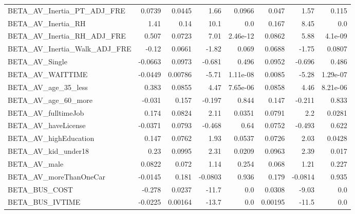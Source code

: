 \begin{tabular}{lrrrrrrr}
BETA\_AV\_Inertia\_PT\_ADJ\_FRE       &   0.0739 &   0.0445 &    1.66 &   0.0966 &         0.047 &         1.57 &         0.115 \\
BETA\_AV\_Inertia\_RH               &     1.41 &     0.14 &    10.1 &      0.0 &         0.167 &         8.45 &           0.0 \\
BETA\_AV\_Inertia\_RH\_ADJ\_FRE       &    0.507 &   0.0723 &    7.01 & 2.46e-12 &        0.0862 &         5.88 &       4.1e-09 \\
BETA\_AV\_Inertia\_Walk\_ADJ\_FRE     &    -0.12 &   0.0661 &   -1.82 &    0.069 &        0.0688 &        -1.75 &        0.0807 \\
BETA\_AV\_Single                   &  -0.0663 &   0.0973 &  -0.681 &    0.496 &        0.0952 &       -0.696 &         0.486 \\
BETA\_AV\_WAITTIME                 &  -0.0449 &  0.00786 &   -5.71 & 1.11e-08 &        0.0085 &        -5.28 &      1.29e-07 \\
BETA\_AV\_age\_35\_less              &    0.383 &   0.0855 &    4.47 & 7.65e-06 &        0.0858 &         4.46 &      8.21e-06 \\
BETA\_AV\_age\_60\_more              &   -0.031 &    0.157 &  -0.197 &    0.844 &         0.147 &       -0.211 &         0.833 \\
BETA\_AV\_fulltimeJob              &    0.174 &   0.0824 &    2.11 &   0.0351 &        0.0791 &          2.2 &        0.0281 \\
BETA\_AV\_haveLicense              &  -0.0371 &   0.0793 &  -0.468 &     0.64 &        0.0752 &       -0.493 &         0.622 \\
BETA\_AV\_highEducation            &    0.147 &   0.0762 &    1.93 &   0.0537 &        0.0726 &         2.03 &        0.0428 \\
BETA\_AV\_kid\_under18              &     0.23 &   0.0995 &    2.31 &   0.0209 &        0.0963 &         2.39 &         0.017 \\
BETA\_AV\_male                     &   0.0822 &    0.072 &    1.14 &    0.254 &         0.068 &         1.21 &         0.227 \\
BETA\_AV\_moreThanOneCar           &  -0.0145 &    0.181 & -0.0803 &    0.936 &         0.179 &      -0.0814 &         0.935 \\
BETA\_BUS\_COST                    &   -0.278 &   0.0237 &   -11.7 &      0.0 &        0.0308 &        -9.03 &           0.0 \\
BETA\_BUS\_IVTIME                  &  -0.0225 &  0.00164 &   -13.7 &      0.0 &       0.00195 &        -11.5 &           0.0 \\

\end{tabular}
